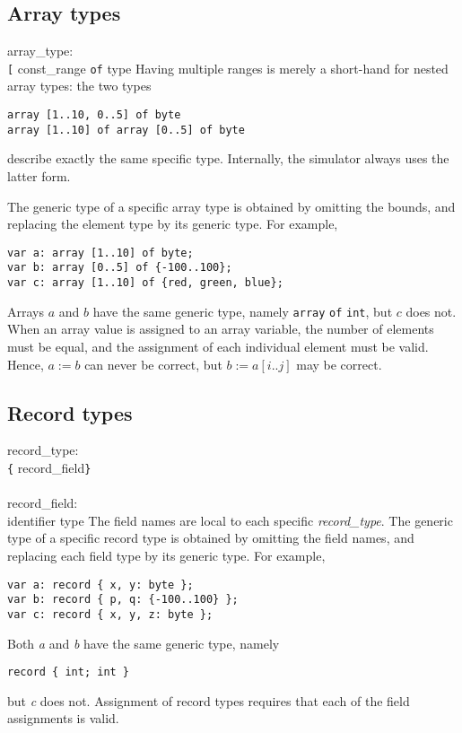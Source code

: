 \subsection{Array types}\label{sec:array}

\grammarstart
array\_type: \\
       {\tt{}[} const\_range\LIST {\tt{}]} {\tt{}of} type
\grammarend
Having multiple ranges is merely a short-hand for nested array types: the
two types
\begin{verbatim}
array [1..10, 0..5] of byte
array [1..10] of array [0..5] of byte
\end{verbatim}
describe exactly the same specific type. Internally, the simulator
always uses the latter form.

The generic type of a specific array type is obtained by omitting the
bounds, and replacing the element type by its generic type. For example,
\begin{verbatim}
var a: array [1..10] of byte;
var b: array [0..5] of {-100..100};
var c: array [1..10] of {red, green, blue};
\end{verbatim}
Arrays $a$ and $b$ have the same generic type, namely {\tt{}array} {\tt{}of}
{\tt{}int}, but $c$ does not. When an array value is assigned to an
array variable, the number of elements must be equal, and the assignment
of each individual element must be valid. Hence, $a:=b$ can never be
correct, but $b:=a[i..j]$ may be correct.

\subsection{Record types}\label{sec:record}

\grammarstart
record\_type: \\
       \verb|{| record\_field\TSEQ \verb|}| \\
 \\
record\_field: \\
      \>identifier\LIST {\tt{}:} type
\grammarend
The field names are local to each specific {\it{}record\_type}. The
generic type of a specific record type is obtained by omitting the field
names, and replacing each field type by its generic type. For example,
\begin{verbatim}
var a: record { x, y: byte };
var b: record { p, q: {-100..100} };
var c: record { x, y, z: byte };
\end{verbatim}
Both {\it{}a} and {\it{}b} have the same generic type, namely
\begin{verbatim}
record { int; int }
\end{verbatim}
but {\it{}c} does not. Assignment of record types requires that each of the
field assignments is valid.

